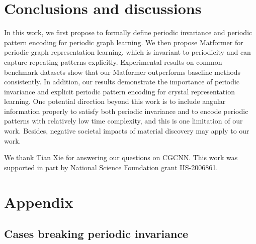 \documentclass{article}
\begin{document}
\section{Conclusions and discussions}
In this work, we first propose to formally define periodic invariance and periodic pattern encoding for periodic graph learning. We then propose Matformer for periodic graph representation learning, which is invariant to periodicity and can capture repeating patterns explicitly. Experimental results on common benchmark datasets show that our Matformer outperforms baseline methods consistently. In addition, our results demonstrate the importance of periodic invariance and explicit periodic pattern encoding for crystal representation learning. One potential direction beyond this work is to include angular information properly to satisfy both periodic invariance and to encode periodic patterns with relatively low time complexity, and this is one limitation of our work. Besides, negative societal impacts of material discovery may apply to our work.

\begin{ack}
We thank Tian Xie for answering our questions on CGCNN. This work was supported in part by National Science Foundation grant IIS-2006861.

\end{ack}








































\newpage

\appendix


\section{Appendix}

\subsection{Cases breaking periodic invariance}
\label{app:breakingpi}
\end{document}
